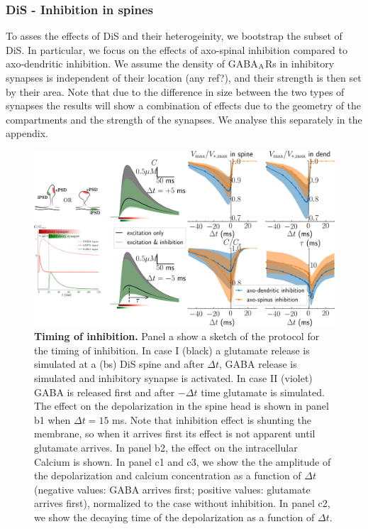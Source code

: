 \documentclass[10pt,letterpaper]{article}
\begin{document}
\subsubsection*{DiS - Inhibition in spines}

To asses the effects of DiS and their heterogeinity, we bootstrap the subset of DiS.
In particular, we focus on the effects of axo-spinal inhibition compared to axo-dendritic inhibition. We assume the density of GABA$_{\rm A}$Rs in inhibitory synapses is independent of their location (any ref?), and their strength is then set by their area. Note that due to the difference in size between the two types of synapses the results will show a combination of effects due to the geometry of the compartments and the strength of the synapses. We analyse this separately in the appendix.

\begin{figure}[tb!]
\includegraphics[width=1.0\linewidth]{f2}
\caption{{\bf Timing of inhibition.} 
Panel a show a sketch of the protocol for the timing of inhibition. In case  I (black) a glutamate release is simulated at a (bs) DiS spine and after $\Delta t$, GABA release is simulated and inhibitory synapse is activated. In case II (violet) GABA is released first and after $-\Delta t$ time  glutamate is simulated. The effect on the depolarization in the spine head is shown in panel b1 when $\Delta t= 15$ ms. Note that inhibition effect is shunting the membrane, so when it arrives first its effect is not apparent until glutamate arrives. In panel b2, the effect on the intracellular Calcium is shown.
In panel c1 and c3, we show the the amplitude of the depolarization and calcium concentration as a function of $\Delta t$ (negative values: GABA arrives first; positive values: glutamate arrives first), normalized to the case without inhibition. In panel c2, we show the decaying time of the depolarization as a function of $\Delta t$.
}\label{fig:TimingInhibition}
\end{figure}
\end{document}
